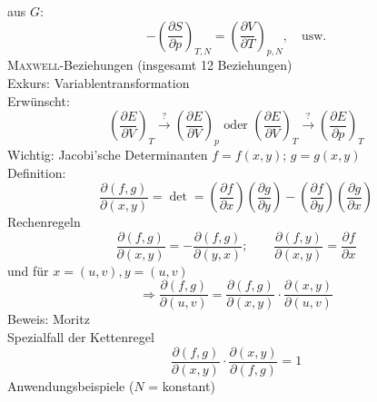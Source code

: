 aus $G$:
\begin{equation}
  - \left( \frac{\partial S}{\partial p} \right)_{T, N} = \left( \frac{\partial V}{\partial T} \right)_{p, N}, \quad \text{usw.}
\end{equation}
\textsc{Maxwell}-Beziehungen (insgesamt 12 Beziehungen) \\
Exkurs: Variablentransformation \\
Erwünscht:
\begin{equation}
  \left( \frac{\partial E}{\partial V} \right)_T \overset{?}{\rightarrow} \left( \frac{\partial E}{\partial V} \right)_p
  \text{ oder }
  \left( \frac{\partial E}{\partial V} \right)_T \overset{?}{\rightarrow} \left( \frac{\partial E}{\partial p} \right)_T
\end{equation}
Wichtig: Jacobi'sche Determinanten $f=f(x, y)$; $g=g(x, y)$ \\
Definition:
\begin{equation}
  \frac{\partial (f, g)}{\partial(x, y)} = \det = \left( \frac{\partial f}{\partial x} \right) \left( \frac{\partial g}{\partial
  y} \right) - \left( \frac{\partial f}{\partial y} \right) \left( \frac{\partial g}{\partial x} \right)
\end{equation}
Rechenregeln
\begin{equation}
  \frac{\partial(f, g)}{\partial(x, y)} = -\frac{\partial(f, g)}{\partial(y, x)}; \qquad
  \frac{\partial(f, y)}{\partial(x, y)} = \frac{\partial f}{\partial x}
\end{equation}
und für $x=(u, v), y=(u, v)$
\begin{equation}
  \Rightarrow \frac{\partial(f, g)}{\partial(u, v)} = \frac{\partial(f, g)}{\partial(x, y)} \cdot \frac{\partial(x, y)}{\partial(u, v)}
\end{equation}
Beweis: Moritz \\
Spezialfall der Kettenregel 
\begin{equation}
  \frac{\partial(f, g)}{\partial(x, y)} \cdot \frac{\partial(x, y)}{\partial(f, g)} = 1
\end{equation}
Anwendungsbeispiele ($N$ = konstant)
